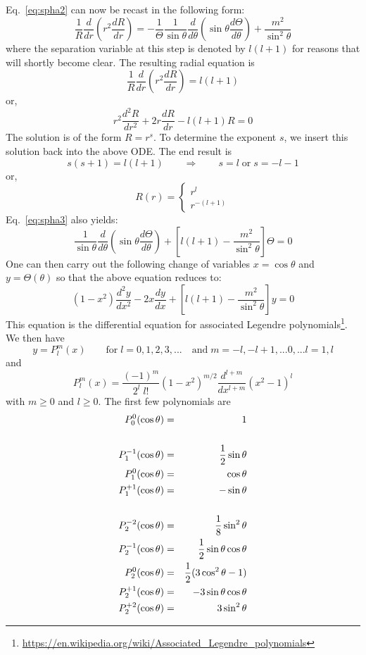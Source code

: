 Eq.~\eqref{eq:spha2} can now be recast in the following form:
\begin{equation}
 \frac{1}{R} \frac{d}{dr} \left( r^2 \frac{dR}{dr} \right) 
= 
-\frac{1}{\Theta}\frac{1}{\sin\theta} \frac{d}{d\theta} \left( \sin \theta \frac{d\Theta}{d\theta} \right) 
+\frac{m^2}{\sin^2\theta} \label{eq:spha3}
\end{equation}
where the separation variable at this step is denoted by $l(l + 1)$ for reasons that will shortly
become clear.
The resulting radial equation is 
\[
\frac{1}{R} \frac{d}{dr} \left( r^2 \frac{dR}{dr} \right)  = l(l+1)
\]
or, 
\[
r^2 \frac{d^2R}{dr^2} + 2 r \frac{dR}{dr} - l(l+1)R =0
\]
The solution is of the form $R=r^s$. To determine the exponent $s$, 
we insert this solution back into the above ODE. The end result is
\[
s(s+1)=l(l+1) \qquad \Rightarrow \qquad s=l \; \text{or} \; s=-l-1
\]
or, 
\[
R(r) = 
\left\{
\begin{array}{c}
r^l \\ r^{-(l+1)}
\end{array}
\right.
\]
Eq.~\eqref{eq:spha3} also yields:
\[
\frac{1}{\sin\theta} \frac{d}{d\theta} \left( \sin\theta \frac{d\Theta}{d\theta} \right) 
+
\left[ l(l+1) - \frac{m^2}{\sin^2\theta} \right] \Theta = 0
\]
One can then carry out the following change of variables $x=\cos\theta$ and $y=\Theta(\theta)$ so that 
the above equation reduces to:
\[
(1-x^2) \frac{d^2 y}{d x^2} - 2x \frac{dy}{dx} + 
\left[ l(l+1)-\frac{m^2}{\sin^2\theta} \right] y =0
\]
This equation is the differential equation for associated Legendre 
polynomials\footnote{\url{https://en.wikipedia.org/wiki/Associated_Legendre_polynomials}}.
We then have
\[
y=P_l^m(x) \qquad \text{for} \; l=0,1,2,3,... \quad \text{and} \; m=-l,-l+1,...0,...l=1,l
\]
and 
\[
P_l^m(x)= \frac{(-1)^m}{2^l \; l!} (1-x^2)^{m/2}
\frac{d^{l+m}}{dx^{l+m}} (x^2-1)^l
\]
with $m \geq 0$ and $l\geq 0$.
The first few polynomials are
\begin{eqnarray}
P_0^0(\cos\theta)    &=& 1 \nonumber\\ \nonumber\\ 
P_1^{-1}(\cos\theta) &=& \frac12 \sin\theta \nonumber\\ 
P_1^{0}(\cos\theta)  &=&  \cos\theta \nonumber\\ 
P_1^{+1}(\cos\theta) &=& -\sin\theta \nonumber\\ \nonumber\\
P_2^{-2}(\cos\theta) &=& \frac18 \sin^2\theta \nonumber\\
P_2^{-1}(\cos\theta) &=& \frac12\sin\theta\cos\theta \nonumber\\
P_2^{0}(\cos\theta)  &=& \frac12(3\cos^2\theta -1) \nonumber\\
P_2^{+1}(\cos\theta) &=& -3 \sin\theta\cos\theta \nonumber\\
P_2^{+2}(\cos\theta) &=& 3\sin^2\theta \nonumber
\end{eqnarray}





